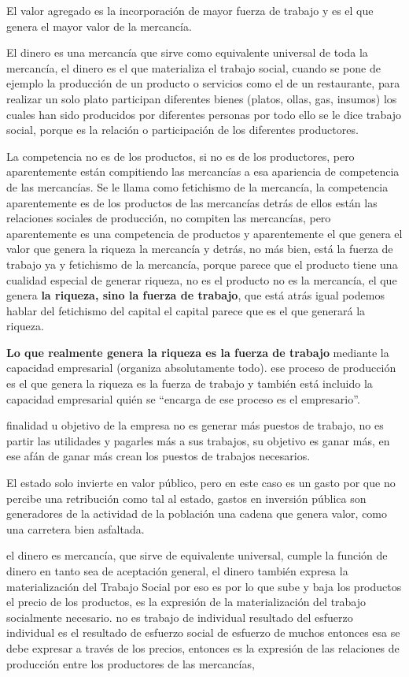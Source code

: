 \documentclass[
  letterpaper,
  DIV=11,
  numbers=noendperiod]{scrartcl}
\begin{document}
El valor agregado es la incorporación de mayor fuerza de trabajo y es el
que genera el mayor valor de la mercancía.

El dinero es una mercancía que sirve como equivalente universal de toda
la mercancía, el dinero es el que materializa el trabajo social, cuando
se pone de ejemplo la producción de un producto o servicios como el de
un restaurante, para realizar un solo plato participan diferentes bienes
(platos, ollas, gas, insumos) los cuales han sido producidos por
diferentes personas por todo ello se le dice trabajo social, porque es
la relación o participación de los diferentes productores.

La competencia no es de los productos, si no es de los productores, pero
aparentemente están compitiendo las mercancías a esa apariencia de
competencia de las mercancías. Se le llama como fetichismo de la
mercancía, la competencia aparentemente es de los productos de las
mercancías detrás de ellos están las relaciones sociales de producción,
no compiten las mercancías, pero aparentemente es una competencia de
productos y aparentemente el que genera el valor que genera la riqueza
la mercancía y detrás, no más bien, está la fuerza de trabajo ya y
fetichismo de la mercancía, porque parece que el producto tiene una
cualidad especial de generar riqueza, no es el producto no es la
mercancía, el que genera \textbf{la riqueza, sino la fuerza de trabajo},
que está atrás igual podemos hablar del fetichismo del capital el
capital parece que es el que generará la riqueza.

\textbf{Lo que realmente genera la riqueza es la fuerza de trabajo}
mediante la capacidad empresarial (organiza absolutamente todo). ese
proceso de producción es el que genera la riqueza es la fuerza de
trabajo y también está incluido la capacidad empresarial quién se
``encarga de ese proceso es el empresario''.

finalidad u objetivo de la empresa no es generar más puestos de trabajo,
no es partir las utilidades y pagarles más a sus trabajos, su objetivo
es ganar más, en ese afán de ganar más crean los puestos de trabajos
necesarios.

El estado solo invierte en valor público, pero en este caso es un gasto
por que no percibe una retribución como tal al estado, gastos en
inversión pública son generadores de la actividad de la población una
cadena que genera valor, como una carretera bien asfaltada.

el dinero es mercancía, que sirve de equivalente universal, cumple la
función de dinero en tanto sea de aceptación general, el dinero también
expresa la materialización del Trabajo Social por eso es por lo que sube
y baja los productos el precio de los productos, es la expresión de la
materialización del trabajo socialmente necesario. no es trabajo de
individual resultado del esfuerzo individual es el resultado de esfuerzo
social de esfuerzo de muchos entonces esa se debe expresar a través de
los precios, entonces es la expresión de las relaciones de producción
entre los productores de las mercancías,
\end{document}
